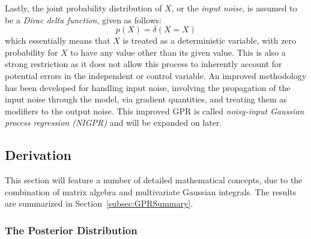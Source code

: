 \documentclass{article}
\begin{document}
Lastly, the joint probability distribution of $X$, or the \emph{input noise}, is assumed to be a \emph{Dirac delta function}, given as follows:
\begin{equation}
\label{eq:DeltaInputNoiseAssumption}
	p\!\left(X\right) = \delta\!\left(X = X\right)
\end{equation}
which essentially means that $X$ is treated as a deterministic variable, with zero probability for $X$ to have any value other than its given value. This is also a strong restriction as it does not allow this process to inherently account for potential errors in the independent or control variable. An improved methodology has been developed for handling input noise, involving the propagation of the input noise through the model, via gradient quantities, and treating them as modifiers to the output noise. This improved GPR is called \emph{noisy-input Gaussian process regression (NIGPR)} and will be expanded on later.

\subsection{Derivation}
\label{subsec:GPRDerivation}

This section will feature a number of detailed mathematical concepts, due to the combination of matrix algebra and multivariate Gaussian integrals. The results are summarized in Section~\ref{subsec:GPRSummary}.

\subsubsection{The Posterior Distribution}
\label{subsubsec:GPRPosteriorDerivation}
\end{document}

